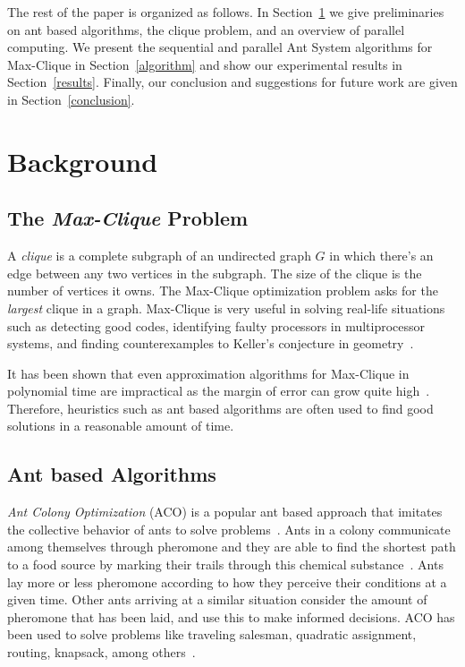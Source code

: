 \documentclass[11pt]{article}
\begin{document}
The rest of the paper is organized as follows. In Section~\ref{background} we give preliminaries on ant based algorithms, the clique problem, and an overview of parallel computing.  We present the sequential and parallel Ant System algorithms for Max-Clique in Section~\ref{algorithm} and show our experimental results in Section~\ref{results}.  Finally, our conclusion and suggestions for future work are given in Section~\ref{conclusion}.


\section{Background}\label{background} 
\subsection{The \textit{Max-Clique} Problem}

A \textit{clique} is a complete subgraph of an undirected graph $G$ in which there's an edge between any two vertices in the subgraph.  The size of the clique is the number of vertices it owns. The  Max-Clique optimization problem asks for the \textit{largest} clique in a graph.  Max-Clique is very useful in solving real-life situations such as detecting good codes, identifying faulty processors in multiprocessor systems, and finding counterexamples to Keller's conjecture in geometry~\cite{BP2}\cite{Sloane}\cite{SMW}\cite{Keller}\cite{LS}.

It has been shown that even approximation algorithms for Max-Clique in polynomial time are impractical as the margin of error can grow quite high~\cite{Hastad}. Therefore, heuristics such as ant based algorithms are often used to find good solutions in a reasonable amount of time.

\subsection{Ant based Algorithms}\label{max_clique} 


\textit{Ant Colony Optimization} (ACO) is a popular ant based approach that imitates the collective behavior of ants to solve problems~\cite{DD}. Ants in a colony communicate among themselves through pheromone and they are able to find the shortest path to a food source by marking their trails through this chemical substance~\cite{BDT}. Ants lay more or less pheromone according to how they perceive their conditions at a given time. Other ants arriving at a similar situation consider the amount of pheromone that has been laid, and use this to make informed decisions. ACO has been used to solve problems like traveling salesman, quadratic assignment, routing, knapsack, among others~\cite{DG, TAIL, MC}.
\end{document}
